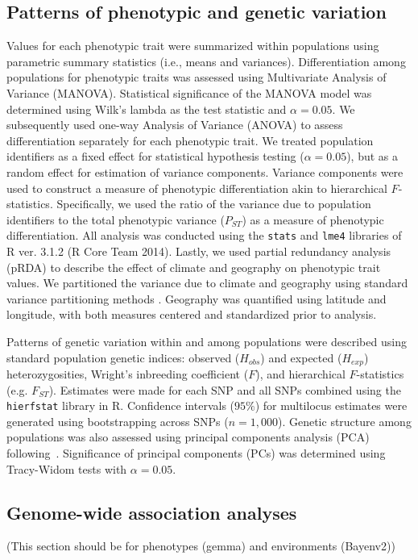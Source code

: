 \documentclass[fleqn,11pt]{wlpeerj}
\begin{document}
\subsection*{Patterns of phenotypic and genetic variation}

Values for each phenotypic trait were summarized  within populations using
parametric summary statistics (i.e., means and variances). Differentiation among
populations for phenotypic traits was assessed using Multivariate Analysis of
Variance (MANOVA). Statistical significance of the MANOVA model was determined
using Wilk's lambda as the test statistic and $\alpha = 0.05$. We subsequently
used one-way Analysis of Variance (ANOVA) to assess differentiation separately
for each phenotypic trait. We treated population identifiers as a fixed effect
for statistical hypothesis testing ($\alpha = 0.05$), but as a random effect for
estimation of variance components. Variance components were used to construct a
measure of phenotypic differentiation akin to hierarchical $F$-statistics.
Specifically, we used the ratio of the variance due to population identifiers to
the total phenotypic variance ($P_{ST}$) as a measure of phenotypic
differentiation. All analysis was conducted using the \texttt{stats} and
\texttt{lme4} libraries of R ver. 3.1.2 (R Core Team 2014). Lastly, we used
partial redundancy analysis (pRDA) to describe the effect of climate and
geography on phenotypic trait values. We partitioned the variance due to climate
and geography using standard variance partitioning methods \citep{Borcard:1992}.
Geography was quantified using latitude and longitude, with both measures
centered and standardized prior to analysis. 

Patterns of genetic variation within and among populations were described using
standard population genetic indices: observed ($H_{obs}$) and expected
($H_{exp}$) heterozygosities, Wright's inbreeding coefficient ($F$), and
hierarchical $F$-statistics (e.g. $F_{ST}$). Estimates were made for each SNP
and all SNPs combined using the \texttt{hierfstat} library in R. Confidence
intervals ($95\%$) for multilocus estimates were generated using bootstrapping
across SNPs ($n = 1,000$). Genetic structure among populations was also assessed
using principal components analysis (PCA) following~\cite{Patterson:2006}.
Significance of principal components (PCs) was determined using Tracy-Widom tests
with $\alpha = 0.05$.


\subsection*{Genome-wide association analyses}
(This section should be for phenotypes (gemma) and environments (Bayenv2))
\end{document}
